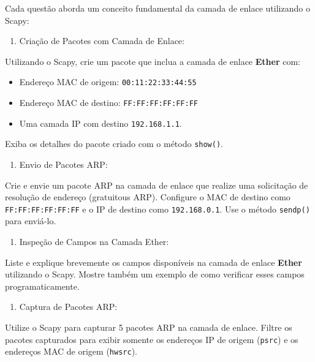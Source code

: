 \justify

Cada questão aborda um conceito fundamental da camada de enlace
utilizando o Scapy:

\begin{enumerate}
\def\labelenumi{\arabic{enumi}.}
\tightlist
\item
  Criação de Pacotes com Camada de Enlace:
\end{enumerate}

Utilizando o Scapy, crie um pacote que inclua a camada de enlace
\textbf{Ether} com:

\begin{itemize}
\tightlist
\item
  Endereço MAC de origem: \texttt{00:11:22:33:44:55}
\item
  Endereço MAC de destino: \texttt{FF:FF:FF:FF:FF:FF}
\item
  Uma camada IP com destino \texttt{192.168.1.1}.
\end{itemize}

Exiba os detalhes do pacote criado com o método \texttt{show()}.

\begin{enumerate}
\def\labelenumi{\arabic{enumi}.}
\setcounter{enumi}{1}
\tightlist
\item
  Envio de Pacotes ARP:
\end{enumerate}

Crie e envie um pacote ARP na camada de enlace que realize uma
solicitação de resolução de endereço (gratuitous ARP). Configure o MAC
de destino como \texttt{FF:FF:FF:FF:FF:FF} e o IP de destino como
\texttt{192.168.0.1}. Use o método \texttt{sendp()} para enviá-lo.

\begin{enumerate}
\def\labelenumi{\arabic{enumi}.}
\setcounter{enumi}{2}
\tightlist
\item
  Inspeção de Campos na Camada Ether:
\end{enumerate}

Liste e explique brevemente os campos disponíveis na camada de enlace
\textbf{Ether} utilizando o Scapy. Mostre também um exemplo de como
verificar esses campos programaticamente.

\begin{enumerate}
\def\labelenumi{\arabic{enumi}.}
\setcounter{enumi}{3}
\tightlist
\item
  Captura de Pacotes ARP:
\end{enumerate}

Utilize o Scapy para capturar 5 pacotes ARP na camada de enlace. Filtre
os pacotes capturados para exibir somente os endereços IP de origem
(\texttt{psrc}) e os endereços MAC de origem (\texttt{hwsrc}).
